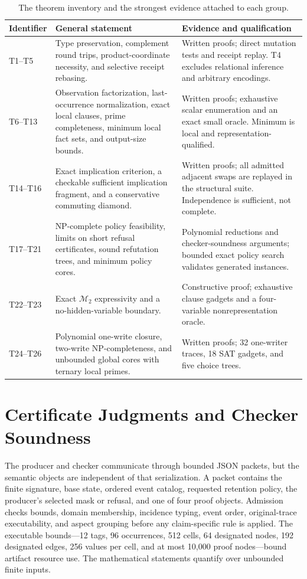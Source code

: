 \begin{table}[t]
\caption{The theorem inventory and the strongest evidence attached to each group.}
\label{tab:theorem-inventory}
\small
\begin{tabularx}{\textwidth}{@{}p{}X p{}@{}}
\toprule
Identifier & General statement & Evidence and qualification \\
\midrule
T1--T5 & Type preservation, complement round trips, product-coordinate necessity, and selective receipt rebasing. & Written proofs; direct mutation tests and receipt replay.  T4 excludes relational inference and arbitrary encodings. \\
T6--T13 & Observation factorization, last-occurrence normalization, exact local clauses, prime completeness, minimum local fact sets, and output-size bounds. & Written proofs; exhaustive scalar enumeration and an exact small oracle.  Minimum is local and representation-qualified. \\
T14--T16 & Exact implication criterion, a checkable sufficient implication fragment, and a conservative commuting diamond. & Written proofs; all admitted adjacent swaps are replayed in the structural suite.  Independence is sufficient, not complete. \\
T17--T21 & NP-complete policy feasibility, limits on short refusal certificates, sound refutation trees, and minimum policy cores. & Polynomial reductions and checker-soundness arguments; bounded exact policy search validates generated instances. \\
T22--T23 & Exact $\mathcal{M}_2$ expressivity and a no-hidden-variable boundary. & Constructive proof; exhaustive clause gadgets and a four-variable nonrepresentation oracle. \\
T24--T26 & Polynomial one-write closure, two-write NP-completeness, and unbounded global cores with ternary local primes. & Written proofs; 32 one-writer traces, 18 SAT gadgets, and five choice trees. \\
\bottomrule
\end{tabularx}
\end{table}

\section{Certificate Judgments and Checker Soundness}
\label{app:checker}

The producer and checker communicate through bounded JSON packets, but the semantic
objects are independent of that serialization.  A packet contains the finite
signature, base state, ordered event catalog, requested retention policy, the
producer's selected mask or refusal, and one of four proof objects.  Admission checks
bounds, domain membership, incidence typing, event order, original-trace executability,
and aspect grouping before any claim-specific rule is applied.  The executable
bounds---12 tags, 96 occurrences, 512 cells, 64 designated nodes, 192 designated
edges, 256 values per cell, and at most 10,000 proof nodes---bound artifact resource
use.  The mathematical statements quantify over unbounded finite inputs.

